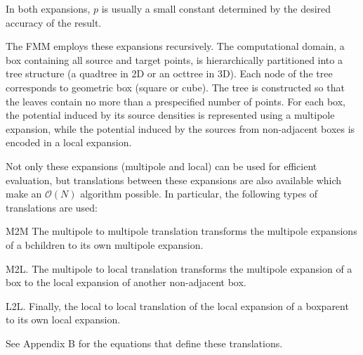 \documentclass[11pt, oneside]{article}   	%
\begin{document}
In both expansions, $p$ is usually a small constant determined by the desired accuracy of the result. 

The FMM employs these expansions recursively. The computational domain, a box containing all source and target points, is hierarchically partitioned into a tree structure (a quadtree in 2D or an octtree in 3D). Each node of the tree corresponds to geometric box (square or cube). The tree is constructed so that the leaves contain no more than a prespecified number of points. For each box, the potential induced by its source densities is represented using a multipole expansion, while the potential induced by the sources from non-adjacent boxes is encoded in a local expansion.

Not only these expansions (multipole and local) can be used for efficient evaluation, but translations between these expansions are also available which make an $\mathcal{O}(N)$ algorithm possible. In particular, the following types of translations are used:

M2M The multipole to multipole translation transforms the multipole expansions of a bchildren to its own multipole expansion.

M2L. The multipole to local translation transforms the multipole expansion of a box to the local expansion
of another non-adjacent box.

L2L. Finally, the local to local translation of the local expansion of a boxparent to its own local expansion.

See Appendix B for the equations that define these translations.
\end{document}
